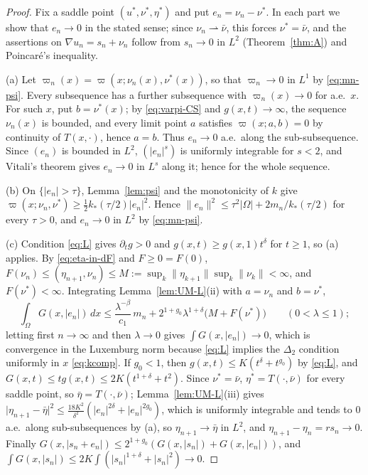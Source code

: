 \documentclass[11pt]{amsart}
\theoremstyle{definition}
\theoremstyle{remark}
\numberwithin{equation}{section}
\newcommand{\dx}{\,dx}
\newcommand{\abs}[1]{\lvert #1\rvert}
\newcommand{\norm}[1]{\lVert #1\rVert}
\newcommand{\weak}{\rightharpoonup}
\begin{document}
\begin{proof}
Fix a saddle point $(u^*,\nu^*,\eta^*)$ and put $e_n=\nu_n-\nu^*$. In each part we show that $e_n\to0$ in the stated sense; since $\nu_n\weak\bar\nu$, this forces $\nu^*=\bar\nu$, and the assertions on $\nabla u_n=s_n+\nu_n$ follow from $s_n\to0$ in $L^2$ (Theorem~\ref{thm:A}) and Poincar\'e's inequality.

(a) Let $\varpi_n(x)=\varpi(x;\nu_n(x),\nu^*(x))$, so that $\varpi_n\to0$ in $L^1$ by \eqref{eq:mn-psi}. Every subsequence has a further subsequence with $\varpi_n(x)\to0$ for a.e.\ $x$. For such $x$, put $b=\nu^*(x)$; by \eqref{eq:varpi-CS} and $g(x,t)\to\infty$, the sequence $\nu_n(x)$ is bounded, and every limit point $a$ satisfies $\varpi(x;a,b)=0$ by continuity of $T(x,\cdot)$, hence $a=b$. Thus $e_n\to0$ a.e.\ along the sub-subsequence. Since $(e_n)$ is bounded in $L^2$, $(\abs{e_n}^s)$ is uniformly integrable for $s<2$, and Vitali's theorem gives $e_n\to0$ in $L^s$ along it; hence for the whole sequence.

(b) On $\{\abs{e_n}>\tau\}$, Lemma~\ref{lem:psi} and the monotonicity of $k$ give $\varpi(x;\nu_n,\nu^*)\ge\frac12k_*(\tau/2)\abs{e_n}^2$. Hence $\norm{e_n}^2\le\tau^2\abs\Omega+2m_n/k_*(\tau/2)$ for every $\tau>0$, and $e_n\to0$ in $L^2$ by \eqref{eq:mn-psi}.

(c) Condition \eqref{eq:L} gives $\partial_tg>0$ and $g(x,t)\ge g(x,1)t^\delta$ for $t\ge1$, so \textup{(a)} applies. By \eqref{eq:eta-in-dF} and $F\ge0=F(0)$, $F(\nu_n)\le(\eta_{n+1},\nu_n)\le M:=\sup_k\norm{\eta_{k+1}}\sup_k\norm{\nu_k}<\infty$, and $F(\nu^*)<\infty$. Integrating Lemma~\ref{lem:UM-L}(ii) with $a=\nu_n$ and $b=\nu^*$,
\[
\int_\Omega G(x,\abs{e_n})\dx\le\frac{\lambda^{-\beta}}{c_1}\,m_n+2^{1+g_0}\lambda^{1+\delta}\big(M+F(\nu^*)\big)\qquad(0<\lambda\le1);
\]
letting first $n\to\infty$ and then $\lambda\to0$ gives $\int G(x,\abs{e_n})\to0$, which is convergence in the Luxemburg norm because \eqref{eq:L} implies the $\Delta_2$ condition uniformly in $x$ \eqref{eq:kcomp}. If $g_0<1$, then $g(x,t)\le K(t^\delta+t^{g_0})$ by \eqref{eq:L}, and $G(x,t)\le tg(x,t)\le2K(t^{1+\delta}+t^2)$. Since $\nu^*=\bar\nu$, $\eta^*=T(\cdot,\bar\nu)$ for every saddle point, so $\bar\eta=T(\cdot,\bar\nu)$; Lemma~\ref{lem:UM-L}(iii) gives $\abs{\eta_{n+1}-\bar\eta}^2\le\frac{18K^2}{\delta^2}(\abs{e_n}^{2\delta}+\abs{e_n}^{2g_0})$, which is uniformly integrable and tends to $0$ a.e.\ along sub-subsequences by \textup{(a)}, so $\eta_{n+1}\to\bar\eta$ in $L^2$, and $\eta_{n+1}-\eta_n=rs_n\to0$. Finally $G(x,\abs{s_n+e_n})\le2^{1+g_0}(G(x,\abs{s_n})+G(x,\abs{e_n}))$, and $\int G(x,\abs{s_n})\le2K\int(\abs{s_n}^{1+\delta}+\abs{s_n}^2)\to0$.
\end{proof}
\end{document}
